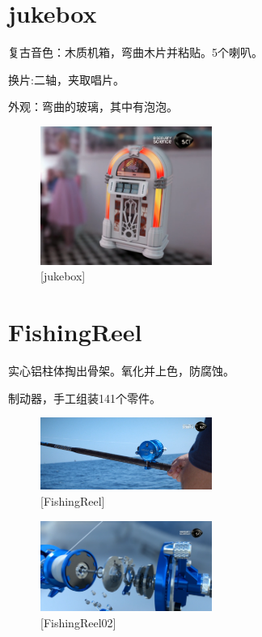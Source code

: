 \documentclass[UTF8]{../../../../RepresentationUniverse}
\begin{document}
\section{jukebox}

复古音色：木质机箱，弯曲木片并粘贴。5个喇叭。

换片:二轴，夹取唱片。

外观：弯曲的玻璃，其中有泡泡。 

\begin{figure}[h]
    \centering
    \includegraphics[width=0.5\textwidth]{./src/figures/jukebox_2023-04-22_11-52-45.png}
    \caption{[jukebox]}
    \label{figure:jukebox}
\end{figure}


\section{FishingReel}

实心铝柱体掏出骨架。氧化并上色，防腐蚀。

制动器，手工组装141个零件。


\begin{figure}[h]
    \centering
    \includegraphics[width=0.5\textwidth]{./src/figures/FishingReel_2023-04-22_11-58-00.png}
    \caption{[FishingReel]}
    \label{figure:FishingReel}
\end{figure}

\begin{figure}[h]
    \centering
    \includegraphics[width=0.5\textwidth]{./src/figures/FishingReel02_2023-04-22_11-58-00.png}
    \caption{[FishingReel02]}
    \label{figure:FishingReel02}
\end{figure}
\end{document}
